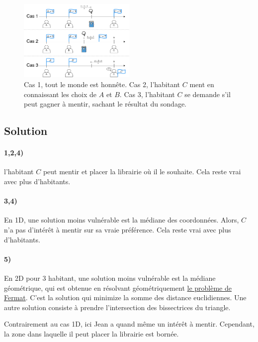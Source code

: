 \documentclass[a4paper,10pt,oneside]{article}
\begin{document}
\begin{figure}[!h]
  \centering
  \includegraphics[width=0.50\textwidth]{figures/library.png}
  \caption{
    Cas 1, tout le monde est honnête. 
    Cas 2, l'habitant $C$ ment en connaissant les choix de $A$ et $B$. 
    Cas 3, l'habitant $C$ se demande s'il peut gagner à mentir, sachant le résultat du sondage.}
\end{figure}

\subsection{Solution}

\paragraph*{1,2,4)} 
l'habitant $C$ peut mentir et placer la librairie où il le souhaite. Cela reste vrai avec plus d'habitants.

\paragraph*{3,4)} 
En 1D, une solution moins vulnérable est la médiane des coordonnées. 
Alors, $C$ n'a pas d'intérêt à mentir sur sa vraie préférence. Cela reste vrai avec plus d'habitants.

\paragraph*{5)} 
En 2D pour 3 habitant, une solution moins vulnérable est la médiane géométrique, qui est obtenue en résolvant géométriquement \href{https://fr.wikipedia.org/wiki/Probl%C3%A8me_de_Weber}{le problème de Fermat}. 
C'est la solution qui minimize la somme des distance euclidiennes.
Une autre solution consiste à prendre l'intersection des bissectrices du triangle.

Contrairement au cas 1D, ici Jean a quand même un intérêt à mentir.
Cependant, la zone dans laquelle il peut placer la librairie est bornée.
\end{document}
